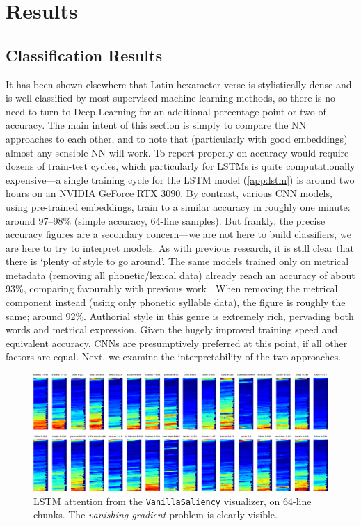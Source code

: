 \documentclass[
    twocolumn,
    hf,
]{ceurart}
\begin{document}
\section{Results}

\subsection{Classification Results}

It has been shown elsewhere that Latin hexameter verse is stylistically dense
\cite{nagy2021metre} and is well classified by most supervised machine-learning
methods, so there is no need to turn to Deep Learning for an additional
percentage point or two of accuracy. The main intent of this section is simply
to compare the NN approaches to each other, and to note that (particularly with
good embeddings) almost any sensible NN will work. To report properly on
accuracy would require dozens of train-test cycles, which particularly for LSTMs
is quite computationally expensive---a single training cycle for the LSTM model
(\ref{app:lstm}) is around two hours on an NVIDIA GeForce RTX 3090. By contrast,
various CNN models, using pre-trained embeddings, train to a similar accuracy in
roughly one minute: around 97--98\% (simple accuracy, 64-line samples). But
frankly, the precise accuracy figures are a secondary concern---we are not here
to build classifiers, we are here to try to interpret models. As with previous
research, it is still clear that there is `plenty of style to go around'. The
same models trained only on metrical metadata (removing all phonetic/lexical
data) already reach an accuracy of about 93\%, comparing favourably with
previous work \cite{nagy2021metre}. When removing the metrical component instead
(using only phonetic syllable data), the figure is roughly the same; around
92\%. Authorial style in this genre is extremely rich, pervading both words and
metrical expression. Given the hugely improved training speed and equivalent
accuracy, CNNs are presumptively preferred at this point, if all other factors
are equal. Next, we examine the interpretability of the two approaches.

\begin{figure}
    \includegraphics[width=\textwidth]{figures/thumbs64-crop.pdf}
    \caption{ LSTM attention from the \texttt{VanillaSaliency}
        visualizer, on 64-line chunks. The \emph{vanishing gradient} problem is
        clearly visible.}
    \label{fig:thumbs32}
\end{figure}
\end{document}
